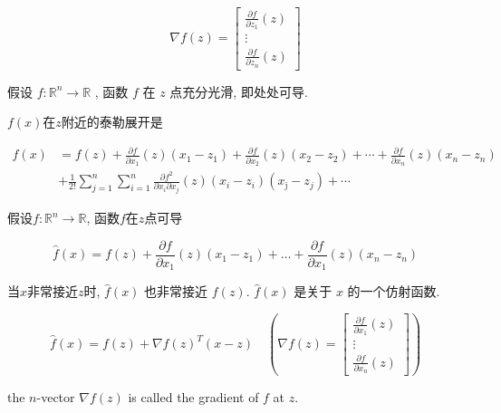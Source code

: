 \begin{definition}[$f$在点$z$的梯度]
    $$ \nabla f(z)=\left[\begin{array}{c}\frac{\partial f}{\partial z_{1}}(z) \\ \vdots \\ \frac{\partial f}{\partial z_{n}}(z)\end{array}\right] $$
\end{definition}

\begin{definition}
    假设 $ f: \mathbb{R}^{n} \rightarrow \mathbb{R} $ , 函数 $ f $ 在 $ z $ 点充分光滑, 即处处可导.

    $f(x)$在$z$附近的泰勒展开是

    $$\begin{aligned} f(x)&=f(z)+\frac{\partial f}{\partial x_{1}}(z)\left(x_{1}-z_{1}\right)+\frac{\partial f}{\partial x_{2}}(z)\left(x_{2}-z_{2}\right)+\cdots+\frac{\partial f}{\partial x_{n}}(z)\left(x_{n}-z_{n}\right) 
    \\ & +\frac{1}{2 !} \sum_{j=1}^{n} \sum_{i=1}^{n} \frac{\partial f^{2}}{\partial x_{i} \partial x_{j}}(z)\left(x_{i}-z_{i}\right)\left(x_{\mathrm{j}}-z_{j}\right)+\cdots \end{aligned}$$
\end{definition}


\begin{definition}[一阶泰勒公式]
    假设$ f: \mathbb{R}^{n} \rightarrow \mathbb{R} $, 函数$f$在$z$点可导

    $$ \hat{f}(x)=f(z)+\frac{\partial f}{\partial x_{1}}(z)\left(x_{1}-z_{1}\right)+\ldots+\frac{\partial f}{\partial x_{1}}(z)\left(x_{n}-z_{n}\right) $$
\end{definition}

当$x$非常接近$z$时, $ \hat{f}(x) $ 也非常接近 $ f(z) $.  
$ \hat{f}(x) $ 是关于 $ x $ 的一个仿射函数. 

\begin{corollary}[一阶泰勒公式的内积形式]
    $$ \hat{f}(x)=f(z)+\nabla f(z)^{T}(x-z) \quad (\nabla f(z)=\left[\begin{array}{c}\frac{\partial f}{\partial x_{1}}(z) \\ \vdots \\ \frac{\partial f}{\partial x_{n}}(z)\end{array}\right]) $$

    the $ n $-vector $ \nabla f(z) $ is called the gradient of $ f $ at $ z $.
\end{corollary} 

